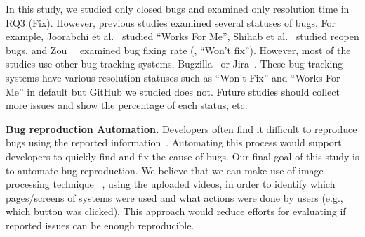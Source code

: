 In this study, we studied only closed bugs and examined only resolution time in RQ3 (Fix). However, previous studies examined several statuses of bugs. For example, Joorabchi et al.~\citep{DBLP:conf/msr/JoorabchiMM14} studied ``Works For Me'', Shihab et al.~\citep{DBLP:journals/ese/ShihabIKIOAHM13} studied reopen bugs, and Zou~\et~\citep{DBLP:conf/compsac/ZouXZCL15} examined bug fixing rate (\eg, ``Won't fix''). 
However, most of the studies use other bug tracking systems, Bugzilla~\citep{Bugzilla} or Jira~\citep{JIRA}. 
These bug tracking systems have various resolution statuses such as ``Won't Fix'' and ``Works For Me''  in default but GitHub we studied does not. 
Future studies should collect more issues and show the percentage of each status, etc. 

\noindent
\textbf{Bug reproduction Automation.}
Developers often find it difficult to reproduce bugs using the reported information~\citep{DBLP:conf/sigsoft/ChaparroLZMPMBN17}\citep{DBLP:conf/icsm/0001KC20}\citep{zimmermann2010TSE}.
Automating this process would support developers to quickly find and fix the cause of bugs. 
Our final goal of this study is to automate bug reproduction. 
We believe that we can make use of image processing technique ~\citep{DBLP:conf/icse/Bernal-Cardenas20}\citep{he2019arxiv}\citep{DBLP:conf/nips/KrizhevskySH12}, using the uploaded videos, in order to identify which pages/screens of systems were used and what actions were done by users (e.g., which button was clicked). 
This approach would reduce efforts for evaluating if reported issues can be enough reproducible. 





